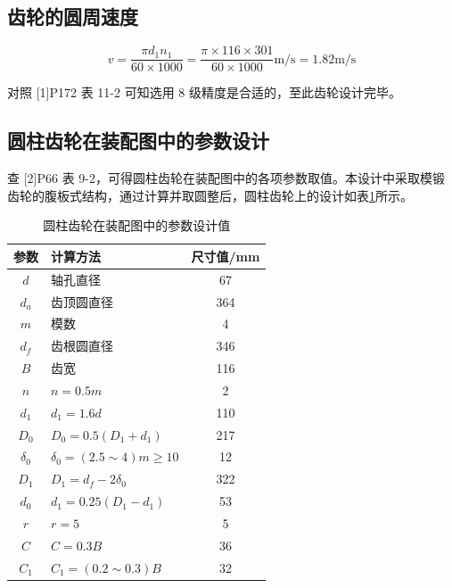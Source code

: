 \documentclass[12pt]{ctexart}
\begin{document}
\subsection{齿轮的圆周速度}

$$v = \frac{\pi d_1n_1}{60\times 1 000}=\frac{\pi \times 116\times 301}{60\times 1000}\text{m/s} = 1.82\text{m/s}$$

对照 [1]P172 表 11-2 可知选用 8 级精度是合适的，至此齿轮设计完毕。

\subsection{圆柱齿轮在装配图中的参数设计}

查 [2]P66 表 9-2，可得圆柱齿轮在装配图中的各项参数取值。本设计中采取模锻齿轮的腹板式结构，通过计算并取圆整后，圆柱齿轮上的设计如表\ref{table17}所示。

\begin{table}[htbp]
    \centering
    \setlength{\belowcaptionskip}{0.3cm}
    \caption{圆柱齿轮在装配图中的参数设计值}
    \begin{tabular}{c l c}
        \toprule
        参数 & 计算方法 & 尺寸值/mm \\
        \midrule
        $d$   & 轴孔直径 & 67 \\
        $d_a$ & 齿顶圆直径 & 364 \\
        $m$   & 模数      & 4 \\
        $d_f$ & 齿根圆直径 & 346 \\
        $B$   & 齿宽     & 116\\
        $n$   & $n=0.5m$ & 2 \\
        $d_1$ & $d_1=1.6d$ & 110 \\
        $D_0$ & $D_0=0.5(D_1+d_1)$ & 217 \\
        $\delta_0$ & $\delta _0=(2.5\sim 4)m\ge 10$ & 12 \\
        $D_1$ & $D_1=d_f-2\delta_0$ & 322 \\
        $d_0$ & $d_1=0.25(D_1-d_1)$ & 53 \\
        $r$   & $r=5$       & 5\\
        $C$   & $C=0.3B$    & 36\\
        $C_1$ & $C_1=(0.2\sim 0.3)B$ & 32\\
        \bottomrule
    \end{tabular}
    
    \label{table17}
\end{table}
\end{document}
